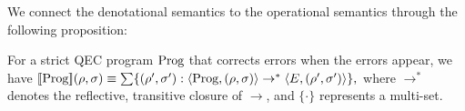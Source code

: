 We connect the denotational semantics to the operational semantics through the following proposition:

\begin{proposition}\label{prop:equiv}
For a strict QEC program $\text{Prog}$ that corrects errors when the errors appear, we have
$
    [\![ \text{Prog} ]\!](\rho, \sigma) \equiv \sum \{  (\rho', \sigma'):\langle \text{Prog}, (\rho, \sigma) \rangle \to^* \langle E, (\rho', \sigma') \rangle \},
$
where $\to^*$ denotes the reflective, transitive closure of $\to$,  and $\{\cdot\}$ represents a multi-set.
\end{proposition}

